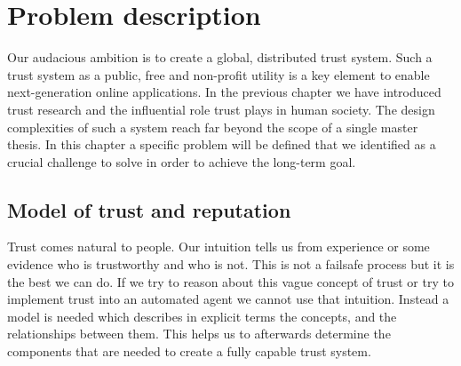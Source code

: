 \chapter{Problem description}
\label{chap:problem}

Our audacious ambition is to create a global, distributed trust system. Such a trust system as a public, free and 
non-profit utility is a key element to enable next-generation online applications. In the 
previous chapter we have introduced trust research and the influential role trust plays in human 
society. The design complexities of such a system reach far beyond the scope of a single 
master thesis. In this chapter a specific problem will be defined that we identified as a crucial
challenge to solve in order to achieve the long-term goal.

\section{Model of trust and reputation}
Trust comes natural to people. Our intuition tells us from experience or some evidence who is 
trustworthy and who is not. This is not a failsafe process but it is the best we can do. If we try
to reason about this vague concept of trust or try to implement trust into an automated agent we
cannot use that intuition. Instead a model is needed which describes in explicit terms the 
concepts, and the relationships between them. This helps us to afterwards determine the components 
that are needed to create a fully capable trust system.


